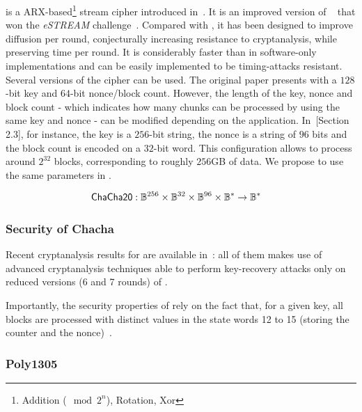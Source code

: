  is a ARX-based\footnote{Addition ($\mod 2^n$), Rotation, Xor} stream cipher introduced in~\cite{bernstein2008chacha}. It is an improved version of ~\cite{Bernstein:2008:SFS:1423346.1423354} that won the \emph{eSTREAM} challenge~\cite{estreamchallenge}. Compared with , it has been designed to improve diffusion per round, conjecturally increasing resistance to cryptanalysis, while preserving time per round. It is considerably faster than \aes{} in software-only implementations and can be easily implemented to be timing-attacks resistant. Several versions of the cipher can be used. The original paper presents  with a $128$-bit key and $64$-bit nonce/block count. However, the length of the key, nonce and block count - which indicates how many chunks can be processed by using the same key and nonce - can be modified depending on the application. In~\cite{langley2018chacha20}[Section 2.3], for instance, the key is a $256$-bit string, the nonce is a string of $96$ bits and the block count is encoded on a $32$-bit word. This configuration allows to process around $2^{32}$ blocks, corresponding to roughly $256$GB of data. We propose to use the same parameters in \zeth{}.

\begin{align*}
    \mathsf{ChaCha20}&: \mathbb{B}^{256} \times \mathbb{B}^{32} \times \mathbb{B}^{96} \times \mathbb{B}^{*} \to \mathbb{B}^{*}
\end{align*}

\subsubsection{Security of Chacha}

Recent cryptanalysis results for \chacha{} are available in~\cite{aumasson2008new,ishiguro2012modified, shi2012improved, maitra2016chosen, choudhuri2016differential, choudhuri2017maitra}: all of them makes use of advanced cryptanalysis techniques able to perform key-recovery attacks only on reduced versions (6 and 7 rounds) of \chacha{}.

\begin{notebox}
    Importantly, the security properties of \chacha{} rely on the fact that, for a given key, all blocks are processed with distinct values in the state words 12 to 15 (storing the counter and the nonce)~\cite[Section 2.3]{langley2018chacha20}.
\end{notebox}

\subsubsection{Poly1305}\label{instantiation:enc:algos:poly1305}

